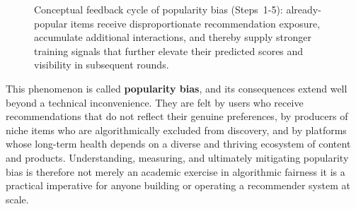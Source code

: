 \documentclass[11pt,a4paper]{report}
\begin{document}
\begin{figure}[htbp]
  \centering
  \caption{Conceptual feedback cycle of popularity bias (Steps~1-5): already-popular items receive disproportionate recommendation exposure, accumulate additional interactions, and thereby supply stronger training signals that further elevate their predicted scores and visibility in subsequent rounds.}
  \label{fig:popularity_feedback_cycle}
\end{figure}

This phenomenon is called \textbf{popularity bias}, and its consequences extend well beyond a technical inconvenience. They are felt by users who receive recommendations that do not reflect their genuine preferences, by producers of niche items who are algorithmically excluded from discovery, and by platforms whose long-term health depends on a diverse and thriving ecosystem of content and products. Understanding, measuring, and ultimately mitigating popularity bias is therefore not merely an academic exercise in algorithmic fairness it is a practical imperative for anyone building or operating a recommender system at scale.
\end{document}
